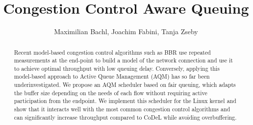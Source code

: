 \documentclass[10pt,sigconf,letterpaper,dvipsnames\ifx\removeHeaders\tempYes ,nonacm\fi\ifx\removeHeaders\tempNo ,anonymous\fi]{acmart}
\begin{document}
\title{Congestion Control Aware Queuing}



\begin{abstract}
Recent model-based congestion control algorithms such as BBR use repeated measurements at the end-point to build a model of the network connection and use it to achieve optimal throughput with low queuing delay. Conversely, applying this model-based approach to Active Queue Management (AQM) has so far been underinvestigated. We propose an AQM scheduler based on fair queuing, which adapts the buffer size depending on the needs of each flow without requiring active participation from the endpoint. We implement this scheduler for the Linux kernel and show that it interacts well with the most common congestion control algorithms and can significantly increase throughput compared to CoDeL while avoiding overbuffering.
\end{abstract}

\author{Maximilian Bachl, Joachim Fabini, Tanja Zseby}



\end{document}
